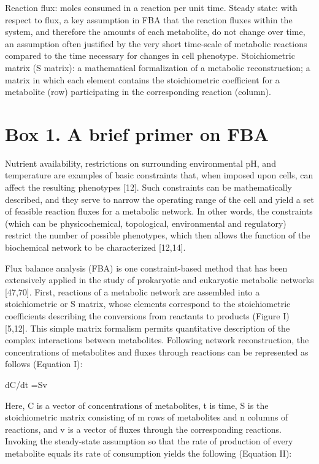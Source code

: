 Reaction flux: moles consumed in a reaction per unit time.
Steady state: with respect to flux, a key assumption in FBA that the reaction fluxes within the system, and therefore the amounts of each metabolite, do not change over time, an assumption often justified by the very short time-scale of metabolic reactions compared to the time necessary for changes in cell phenotype.
Stoichiometric matrix (S matrix): a mathematical formalization of a metabolic reconstruction; a matrix in which each element contains the stoichiometric coefficient for a metabolite (row) participating in the corresponding reaction (column).

\section{Box 1. A brief primer on FBA}
Nutrient availability, restrictions on surrounding 
environmental pH, and temperature are examples of basic 
constraints that, when imposed upon cells, can affect 
the resulting phenotypes [12]. Such constraints can 
be mathematically described, and they serve to narrow 
the operating range of the cell and yield a set of feasible 
reaction fluxes for a metabolic network. In other words, 
the constraints (which can be physicochemical, 
topological, environmental and regulatory) restrict 
the number of possible phenotypes, which then allows 
the function of the biochemical network to be 
characterized [12,14].

Flux balance analysis (FBA) is one constraint-based 
method that has been extensively applied in the study 
of prokaryotic and eukaryotic metabolic networks [47,70]. 
First, reactions of a metabolic network are assembled 
into a stoichiometric or S matrix, whose elements 
correspond to the stoichiometric coefficients describing 
the conversions from reactants to products (Figure I) [5,12]. 
This simple matrix formalism permits quantitative 
description of the complex interactions between metabolites. 
Following network reconstruction, the concentrations of 
metabolites and fluxes through reactions can be represented 
as follows (Equation I):

dC/dt =Sv

Here, C is a vector of concentrations of metabolites, t is 
time, S is the stoichiometric matrix consisting of m rows 
of metabolites and n columns of reactions, and v is a 
vector of fluxes through the corresponding reactions. 
Invoking the steady-state assumption so that the rate 
of production of every metabolite equals its rate of 
consumption yields the following (Equation II):

